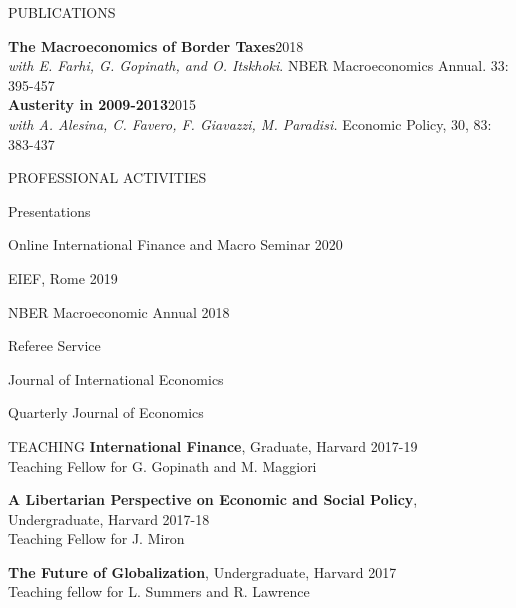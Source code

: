 \documentclass{resume} %
\begin{document}
\begin{rSection}{PUBLICATIONS}
	
	{\textbf{The Macroeconomics of Border Taxes}\hfill{2018}}\\\textit{with E. Farhi, G. Gopinath, and O. Itskhoki}. NBER Macroeconomics Annual. 33: 395-457\\

	
	\textbf{Austerity in 2009-2013}\hfill 2015\\
	\textit{with A. Alesina, C. Favero, F. Giavazzi, M. Paradisi.} Economic Policy, 30, 83: 383-437\\

	
\end{rSection} 




\pagebreak

\begin{rSection}{PROFESSIONAL ACTIVITIES} 
\begin{rSubsection}{Presentations}{}{}{}
	\item Online International Finance and Macro Seminar \hfill 2020
	\item EIEF, Rome \hfill 2019
	\item NBER Macroeconomic Annual \hfill 2018
\end{rSubsection}

\begin{rSubsection}{Referee Service}{}{}{}
	\item Journal of International Economics
	\item Quarterly Journal of Economics
\end{rSubsection}

\end{rSection} 

\begin{rSection}{TEACHING} 
\textbf{International Finance}, Graduate, Harvard \hfill 2017-19 \\
Teaching Fellow for G. Gopinath and M. Maggiori

\textbf{A Libertarian Perspective on Economic and Social Policy}, Undergraduate, Harvard \hfill 2017-18 \\ Teaching Fellow for J. Miron

\textbf{The Future of Globalization}, Undergraduate, Harvard \hfill 2017 \\
Teaching fellow for L. Summers and R. Lawrence
\end{rSection}


\bigskip
\end{document}
